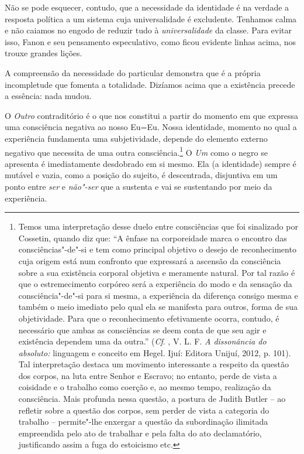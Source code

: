 Não se pode esquecer, contudo, que a necessidade da identidade é na
verdade a resposta política a um sistema cuja universalidade é
excludente. Tenhamos calma e não caiamos no engodo de reduzir tudo à
\emph{universalidade} da classe. Para evitar isso, Fanon e seu
pensamento especulativo, como ficou evidente linhas acima, nos trouxe
grandes lições.

A compreensão da necessidade do particular demonstra que é a própria
incompletude que fomenta a totalidade. Dizíamos acima que a existência
precede a essência: nada mudou.

O \emph{Outro} contraditório é o que nos constitui a partir do momento
em que expressa uma consciência negativa ao nosso Eu=Eu. Nossa
identidade, momento no qual a experiência fundamenta uma subjetividade,
depende do elemento externo negativo que necessita de uma outra
consciência.\footnote{Temos uma interpretação desse duelo entre
  consciências que foi sinalizado por Cossetin, quando diz que: ``A
  ênfase na corporeidade marca o encontro das consciências"-de"-si e tem
  como principal objetivo o desejo de reconhecimento cuja origem está
  num confronto que expressará a ascensão da consciência sobre a sua
  existência corporal objetiva e meramente natural. Por tal razão é que
  o estremecimento corpóreo será a experiência do modo e da sensação da
  consciência"-de"-si para si mesma, a experiência da diferença consigo
  mesma e também o meio imediato pelo qual ela se manifesta para outros,
  forma de sua objetividade. Para que o reconhecimento efetivamente
  ocorra, contudo, é necessário que ambas as consciências se deem conta
  de que seu agir e existência dependem uma da outra.'' (\emph{Cf}. ,
  V. L. F. \emph{A dissonância do absoluto:} linguagem e conceito em
  Hegel. Ijuí: Editora Unijuí, 2012, p. 101). Tal interpretação destaca
  um movimento interessante a respeito da questão dos corpos, na luta
  entre Senhor e Escravo; no entanto, perde de vista a coisidade e o
  trabalho como coerção e, ao mesmo tempo, realização da consciência.
  Mais profunda nessa questão, a postura de Judith Butler -- ao refletir
  sobre a questão dos corpos, sem perder de vista a categoria do
  trabalho -- permite"-lhe enxergar a questão da subordinação ilimitada
  empreendida pelo ato de trabalhar e pela falta do ato declamatório,
  justificando assim a fuga do estoicismo etc.} O \emph{Um} como o
negro se apresenta é imediatamente desdobrado em si mesmo. Ela (a
identidade) sempre é mutável e vazia, como a posição do sujeito, é
descentrada, disjuntiva em um ponto entre \emph{ser} e \emph{não"-ser}
que a sustenta e vai se sustentando por meio da experiência.

